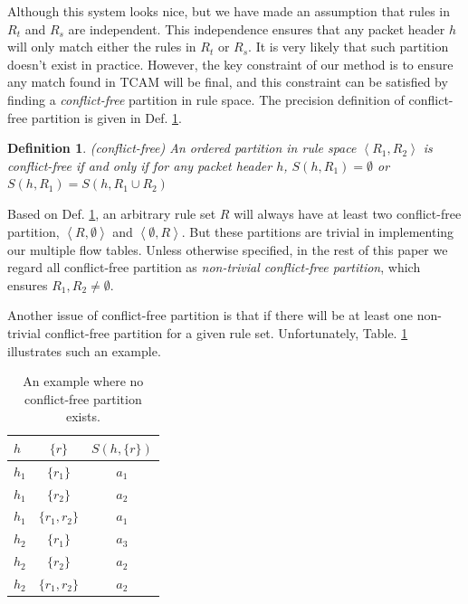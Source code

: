 \documentclass[10pt,twocolumn,letterpaper]{article}
\newtheorem{definition}{Definition}
\begin{document}
Although this system looks nice, but we have made an assumption that rules in $R_t$ and $R_s$ are independent. This independence ensures that any packet header $h$ will only match either the rules in $R_t$ or $R_s$. It is very likely that such partition doesn't exist in practice. However, the key constraint of our method is to ensure any match found in TCAM will be final, and this constraint can be satisfied by finding a \textit{conflict-free} partition in rule space. The precision definition of conflict-free partition is given in Def. \ref{def:conflict_free}.

\begin{definition}
\emph{(conflict-free)}
\label{def:conflict_free}
An ordered partition in rule space $\left< R_1, R_2 \right>$ is conflict-free if and only if for any packet header $h$, $S(h,R_1) = \emptyset$ or $S(h,R_1)=S(h,R_1 \cup R_2)$
\end{definition}

Based on Def. \ref{def:conflict_free}, an arbitrary rule set $R$ will always have at least two conflict-free partition, $\left< R, \emptyset \right>$ and $\left< \emptyset, R \right>$. But these partitions are trivial in implementing our multiple flow tables. Unless otherwise specified, in the rest of this paper we regard all conflict-free partition as \textit{non-trivial conflict-free partition}, which ensures $R_1, R_2 \neq \emptyset$.

Another issue of conflict-free partition is that if there will be at least one non-trivial conflict-free partition for a given rule set. Unfortunately, Table. \ref{tab:negative} illustrates such an example.

\begin{table}[h]
\centering
\begin{tabular}{|lc|c|}
\hline
$h$	 &	$\{r\}$	& $S(h,\{r\})$\\
\hline\hline
$h_1$ & $\{r_1\}$    & $a_1$ \\
$h_1$ & $\{r_2\}$    & $a_2$ \\
$h_1$ & $\{r_1,r_2\}$ & $a_1$\\
$h_2$ & $\{r_1\}$    & $a_3$ \\
$h_2$ & $\{r_2\}$    & $a_2$ \\
$h_2$ & $\{r_1,r_2\}$ & $a_2$\\
\hline
\end{tabular}
\caption{An example where no conflict-free partition exists.}\label{tab:negative}
\end{table}
\end{document}
